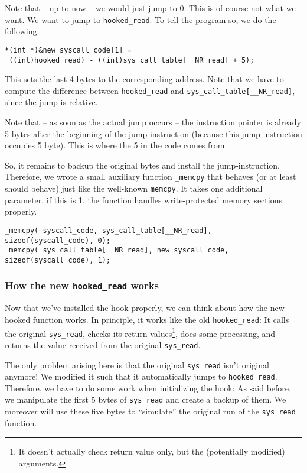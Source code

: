 \documentclass[10pt, letterpaper]{article}
\begin{document}
Note that -- up to now -- we would just jump to 0. This is of course not what we want. We want to jump to \texttt{hooked\_read}. To tell the program so, we do the following:

\begin{verbatim}
*(int *)&new_syscall_code[1] = 
 ((int)hooked_read) - ((int)sys_call_table[__NR_read] + 5);
\end{verbatim}

This sets the last 4 bytes to the corresponding address. Note that we have to compute the difference between \texttt{hooked\_read} and \texttt{sys\_call\_table[\_\_NR\_read]}, since the jump is relative. 

Note that -- as soon as the actual jump occurs -- the instruction pointer is already 5 bytes after the beginning of the jump-instruction (because this jump-instruction occupies 5 byte). This is where the 5 in the code comes from.

So, it remains to backup the original bytes and install the jump-instruction. Therefore, we wrote a small auxiliary function \texttt{\_memcpy} that behaves (or at least should behave) just like the well-known \texttt{memcpy}. It takes one additional parameter, if this is 1, the function handles write-protected memory sections properly.

\begin{verbatim}
_memcpy( syscall_code, sys_call_table[__NR_read], sizeof(syscall_code), 0);
_memcpy( sys_call_table[__NR_read], new_syscall_code, sizeof(syscall_code), 1);
\end{verbatim}

\subsubsection{How the new \texttt{hooked\_read} works}
\label{sec:hooked-read-2-technique}

Now that we've installed the hook properly, we can think about how the new hooked function works. In principle, it works like the old \texttt{hooked\_read}: It calls the original \texttt{sys\_read}, checks its return values\footnote{It doesn't actually check return value only, but the (potentially modified) arguments.}, does some processing, and returns the value received from the original \texttt{sys\_read}.

The only problem arising here is that the original \texttt{sys\_read} isn't original anymore! We modified it such that it automatically jumps to \texttt{hooked\_read}. Therefore, we have to do some work when initializing the hook: As said before, we manipulate the first 5 bytes of \texttt{sys\_read} and create a backup of them. We moreover will use these five bytes to ``simulate'' the original run of the \texttt{sys\_read} function.
\end{document}

